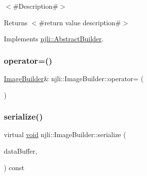 $<$\#\+Description\#$>$

\begin{DoxyReturn}{Returns}
$<$\#return value description\#$>$ 
\end{DoxyReturn}


Implements \mbox{\hyperlink{classnjli_1_1_abstract_builder_a3e6e553e06d1ca30517ad5fb0bd4d000}{njli\+::\+Abstract\+Builder}}.

\mbox{\label{classnjli_1_1_image_builder_a7ebb1a6acfb0a318300b6ea9de0caef0}} 
\subsubsection{\texorpdfstring{operator=()}{operator=()}}
{\footnotesize\ttfamily \mbox{\hyperlink{classnjli_1_1_image_builder}{Image\+Builder}}\& njli\+::\+Image\+Builder\+::operator= (\begin{DoxyParamCaption}\item[{const \mbox{\hyperlink{classnjli_1_1_image_builder}{Image\+Builder}} \&}]{ }\end{DoxyParamCaption})\hspace{0.3cm}{\ttfamily [protected]}}

\mbox{\label{classnjli_1_1_image_builder_ab719ab40b755786e51f571e85c3097a3}} 
\subsubsection{\texorpdfstring{serialize()}{serialize()}}
{\footnotesize\ttfamily virtual \mbox{\hyperlink{_thread_8h_af1e856da2e658414cb2456cb6f7ebc66}{void}} njli\+::\+Image\+Builder\+::serialize (\begin{DoxyParamCaption}\item[{\mbox{\hyperlink{_thread_8h_af1e856da2e658414cb2456cb6f7ebc66}{void}} $\ast$}]{data\+Buffer,  }\item[{bt\+Serializer $\ast$}]{ }\end{DoxyParamCaption}) const\hspace{0.3cm}{\ttfamily [virtual]}}



